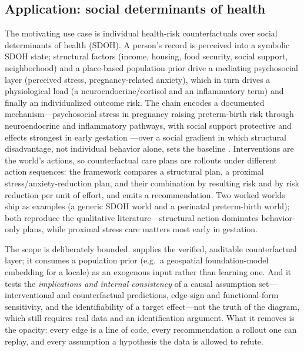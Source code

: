 \subsection{Application: social determinants of health}\label{sec:dag-app}
The motivating use case is individual health-risk counterfactuals over social
determinants of health (SDOH). A person's record is perceived into a symbolic
SDOH state; structural factors (income, housing, food security, social support,
neighborhood) and a place-based population prior drive a mediating psychosocial
layer (perceived stress, pregnancy-related anxiety), which in turn drives a
physiological load (a neuroendocrine/cortisol and an inflammatory term) and
finally an individualized outcome risk. The chain encodes a documented
mechanism---psychosocial stress in pregnancy raising preterm-birth risk through
neuroendocrine and inflammatory pathways, with social support protective and
effects strongest in early gestation \cite{shapiro2013psp}---over a social
gradient in which structural disadvantage, not individual behavior alone, sets
the baseline \cite{marmot2018}. Interventions are the world's actions, so
counterfactual care plans are rollouts under different action sequences: the
framework compares a structural plan, a proximal stress/anxiety-reduction plan,
and their combination by resulting risk and by risk reduction per unit of effort,
and emits a recommendation. Two worked worlds ship as examples (a generic SDOH
world and a perinatal preterm-birth world); both reproduce the qualitative
literature---structural action dominates behavior-only plans, while proximal
stress care matters most early in gestation.

The scope is deliberately bounded. \openworld{} supplies the verified, auditable
counterfactual layer; it consumes a population prior (e.g.\ a geospatial
foundation-model embedding for a locale) as an exogenous input rather than
learning one. And it tests the \emph{implications and internal consistency} of a
causal assumption set---interventional and counterfactual predictions, edge-sign
and functional-form sensitivity, and the identifiability of a target effect---not
the truth of the diagram, which still requires real data and an identification
argument. What it removes is the opacity: every edge is a line of code, every
recommendation a rollout one can replay, and every assumption a hypothesis the
data is allowed to refute.
